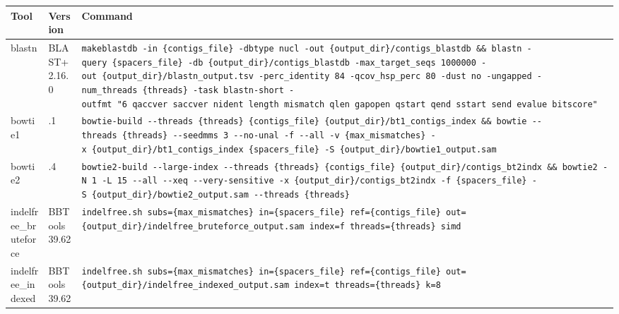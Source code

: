 \documentclass[
]{article}
\begin{document}
\begin{longtable}[]{@{}
  >{\raggedright\arraybackslash}p{}
  >{\raggedright\arraybackslash}p{}
  >{\raggedright\arraybackslash}p{}@{}}
\toprule\noalign{}
\begin{minipage}[b]{\linewidth}\raggedright
Tool
\end{minipage} & \begin{minipage}[b]{\linewidth}\raggedright
Version
\end{minipage} & \begin{minipage}[b]{\linewidth}\raggedright
Command
\end{minipage} \\
\midrule\noalign{}
\endhead
\bottomrule\noalign{}
\endlastfoot
blastn & BLAST+ 2.16.0 &
\texttt{makeblastdb\ -in\ \{contigs\_file\}\ -dbtype\ nucl\ -out\ \{output\_dir\}/contigs\_blastdb\ \&\&\ blastn\ -query\ \{spacers\_file\}\ -db\ \{output\_dir\}/contigs\_blastdb\ -max\_target\_seqs\ 1000000\ -out\ \{output\_dir\}/blastn\_output.tsv\ -perc\_identity\ 84\ -qcov\_hsp\_perc\ 80\ -dust\ no\ -ungapped\ -num\_threads\ \{threads\}\ -task\ blastn-short\ -outfmt\ "6\ qaccver\ saccver\ nident\ length\ mismatch\ qlen\ gapopen\ qstart\ qend\ sstart\ send\ evalue\ bitscore"} \\
bowtie1 & 1.3.1 &
\texttt{bowtie-build\ -\/-threads\ \{threads\}\ \{contigs\_file\}\ \{output\_dir\}/bt1\_contigs\_index\ \&\&\ bowtie\ -\/-threads\ \{threads\}\ -\/-seedmms\ 3\ -\/-no-unal\ -f\ -\/-all\ -v\ \{max\_mismatches\}\ -x\ \{output\_dir\}/bt1\_contigs\_index\ \{spacers\_file\}\ -S\ \{output\_dir\}/bowtie1\_output.sam} \\
bowtie2 & 2.5.4 &
\texttt{bowtie2-build\ -\/-large-index\ -\/-threads\ \{threads\}\ \{contigs\_file\}\ \{output\_dir\}/contigs\_bt2indx\ \&\&\ bowtie2\ -N\ 1\ -L\ 15\ -\/-all\ -\/-xeq\ -\/-very-sensitive\ -x\ \{output\_dir\}/contigs\_bt2indx\ -f\ \{spacers\_file\}\ -S\ \{output\_dir\}/bowtie2\_output.sam\ -\/-threads\ \{threads\}} \\
indelfree\_bruteforce & BBTools 39.62 &
\texttt{indelfree.sh\ subs=\{max\_mismatches\}\ in=\{spacers\_file\}\ ref=\{contigs\_file\}\ out=\{output\_dir\}/indelfree\_bruteforce\_output.sam\ index=f\ threads=\{threads\}\ simd} \\
indelfree\_indexed & BBTools 39.62 &
\texttt{indelfree.sh\ subs=\{max\_mismatches\}\ in=\{spacers\_file\}\ ref=\{contigs\_file\}\ out=\{output\_dir\}/indelfree\_indexed\_output.sam\ index=t\ threads=\{threads\}\ k=8} \\

\end{longtable}
\end{document}
